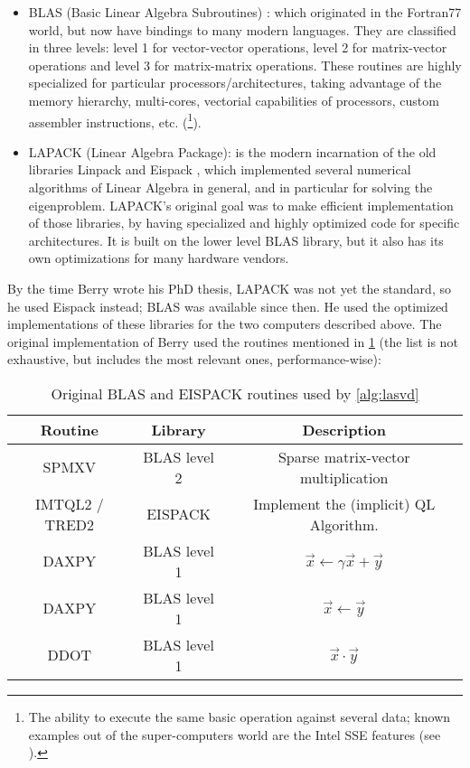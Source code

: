 \begin{itemize}
\item BLAS (Basic Linear Algebra Subroutines) \cite{blas}: which
  originated in the Fortran77 world, but now have bindings to many
  modern languages. They are classified in three levels: level 1 for
  vector-vector operations, level 2 for matrix-vector operations and
  level 3 for matrix-matrix operations. These routines are highly
  specialized for particular processors/architectures, taking
  advantage of the memory hierarchy, multi-cores, vectorial
  capabilities of processors, custom assembler instructions,
  etc. (\footnote{The ability to execute the 
    same basic operation against several data; known
    examples out of the super-computers world are the Intel SSE
    features (see \cite{sse}).}). \\
%
\item LAPACK (Linear Algebra Package): is the modern incarnation of
  the old libraries Linpack \cite{linpack} and Eispack \cite{eispack},
  which implemented several numerical algorithms of Linear Algebra in
  general, and in particular for solving the eigenproblem. LAPACK's original
  goal was to make efficient implementation of those libraries, by
  having specialized and highly optimized code for specific
  architectures. It is built on the lower level BLAS library, but it
  also has its own optimizations for many hardware vendors.
\end{itemize}
\hfill

By the time Berry wrote his PhD thesis, LAPACK was not yet the
standard, so he used Eispack instead; BLAS was available since
then. He used the optimized implementations of these libraries for the
two computers described above. The original implementation of Berry
used the routines mentioned in \cref{tab:lasvd-kernels} (the list is
not exhaustive, but includes the most relevant ones, performance-wise): \\

\begin{table}[!h]
\caption{Original BLAS and EISPACK routines used by \cref{alg:lasvd}}
\label{tab:lasvd-kernels}
\begin{center}
\begin{tabular}{|c|c|c|}
\hline
Routine & Library & Description \\
\hline
\hline
SPMXV & BLAS level 2 & Sparse matrix-vector multiplication \\
\hline
IMTQL2 / TRED2 & EISPACK & Implement the (implicit) QL Algorithm. \\
\hline
DAXPY & BLAS level 1 & $\vec{x} \gets \gamma \vec{x} + \vec{y}$ \\
\hline
DAXPY & BLAS level 1 & $\vec{x} \gets \vec{y}$ \\
\hline
DDOT & BLAS level 1 & $\vec{x} \cdot \vec{y}$ \\
\hline
\end{tabular}
\end{center}
\end{table}

